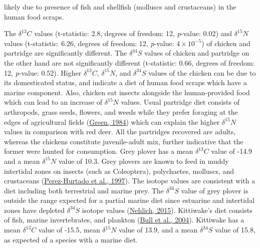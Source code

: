 \documentclass[preprint, 3p, authoryear]{elsarticle} %
\begin{document}
likely due to presence of fish and shellfish (molluscs and crustaceans) in the human food scraps.

The \(\delta ^{13}C\) values (t-statistic: 2.8, degrees of freedom: 12, \emph{p}-value: 0.02) and \(\delta ^{15}N\) values (t-statistic: 6.26, degrees of freedom: 12, \emph{p}-value: \ensuremath{4\times 10^{-5}}) of chicken and partridge are significantly different. The \(\delta ^{34}S\) values of chicken and partridge on the other hand are not significantly different (t-statistic: 0.66, degrees of freedom: 12, \emph{p}-value: 0.52). Higher \(\delta ^{13}C\), \(\delta ^{15}N\), and \(\delta ^{34}S\) values of the chicken can be due to its domesticated status, and indicate a diet of human food scraps which have a marine component. Also, chicken eat insects alongside the human-provided food which can lead to an increase of \(\delta ^{15}N\) values. Usual partridge diet consists of arthropods, grass seeds, flowers, and weeds while they prefer foraging at the edges of agricultural fields (\protect\hyperlink{ref-green84}{Green, 1984}) which can explain the higher \(\delta ^{15}N\) values in comparison with red deer. All the partridges recovered are adults, whereas the chickens constitute juvenile-adult mix, further indicative that the former were hunted for consumption.
Grey plover has a mean \(\delta ^{13}C\) value of -14.9\text{\textperthousand} and a mean \(\delta ^{15}N\) value of 10.3\text{\textperthousand}. Grey plovers are known to feed in muddy intertidal zones on insects (such as Coleoptera), polychaetes, molluscs, and crustaceans (\protect\hyperlink{ref-perez-hurtado_etal97}{Perez-Hurtado et al., 1997}). The isotope values are consistent with a diet including both terrestrial and marine prey. The \(\delta ^{34}S\) value of grey plover is outside the range expected for a partial marine diet since estuarine and intertidal zones have depleted \(\delta ^{34}S\) isotope values (\protect\hyperlink{ref-nehlich15}{Nehlich, 2015}). Kittiwake's diet consists of fish, marine invertebrates, and plankton (\protect\hyperlink{ref-bull_etal04}{Bull et al., 2004}). Kittiwake has a mean \(\delta ^{13}C\) value of -15.5\text{\textperthousand}, mean \(\delta ^{15}N\) value of 13.9\text{\textperthousand}, and a mean \(\delta ^{34}S\) value of 15.8\text{\textperthousand}, as expected of a species with a marine diet.
\end{document}
